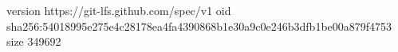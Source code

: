 version https://git-lfs.github.com/spec/v1
oid sha256:54018995e275e4c28178ea4fa4390868b1e30a9c0e246b3dfb1be00a879f4753
size 349692
